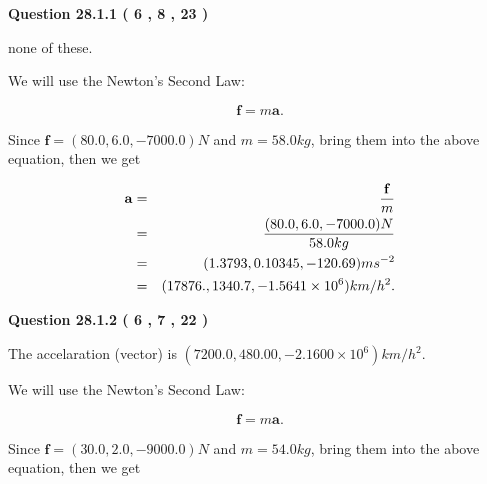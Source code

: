 \documentclass[12pt]{article}
\begin{document}
\vspace{0.2in}
  
{\textbf{\Large{Question
28.1.1 
 (           6 ,           8 ,          23 )
}}}
  
  
 
 
\noindent{}
 
 
none of these.
 
 
 
 
 
 
\noindent{}

We will use the Newton's Second Law:
 
\[
\mathbf{f}=m\mathbf{a}.
\]
 
Since $\mathbf{f}=( %
80.0,  %
6.0,  %
-7000.0 )N$
and $m= %
58.0kg$, bring them into the above equation, then we get
 
\begin{eqnarray*}
\mathbf{a}&=&\frac{\mathbf{f}}m  \\
&=&\frac{(
80.0 ,
6.0 ,
-7000.0 )N
}{ %
58.0 kg}  \\
&=&(
1.3793 ,
0.10345,
-120.69
)ms^{-2} \\
&=&(
17876. ,
1340.7 ,
-1.5641 \times 10^{6}
)km/h^2.
\end{eqnarray*}
 
 
 
  
\vspace{0.2in}
  
{\textbf{\Large{Question
28.1.2 
 (           6 ,           7 ,          22 )
}}}
  
  
 
 
\noindent{}
 
 
The accelaration (vector) is
$(
7200.0,
480.00 ,
-2.1600 \times 10^{6}
)km/h^2.
$
 
 
 
 
 
 
\noindent{}

We will use the Newton's Second Law:
 
\[
\mathbf{f}=m\mathbf{a}.
\]
 
Since $\mathbf{f}=( %
30.0,  %
2.0,  %
-9000.0 )N$
and $m= %
54.0 kg$, bring them into the above equation, then we get
 
\end{document}

